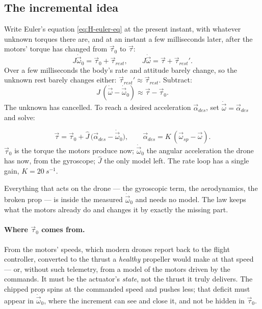 \subsection{The incremental idea}
Write Euler's equation \eqref{eq:H-euler-eq} at the present instant, with whatever unknown torques there are, and at an instant a few milliseconds later, after the motors' torque has changed from $\vec\tau_0$ to $\vec\tau$:
\begin{equation*}
  J\dot{\vec\omega}_0 = \vec\tau_0 + \vec\tau_{rest}, \qquad J\dot{\vec\omega} = \vec\tau + \vec\tau_{rest}' .
\end{equation*}
Over a few milliseconds the body's rate and attitude barely change, so the unknown rest barely changes either: $\vec\tau_{rest}' \approx \vec\tau_{rest}$. Subtract:
\begin{equation}\label{eq:indi-increment}
  J\,(\dot{\vec\omega} - \dot{\vec\omega}_0) \approx \vec\tau - \vec\tau_0 .
\end{equation}
The unknown has cancelled. To reach a desired acceleration $\vec\alpha_{des}$, set $\dot{\vec\omega} = \vec\alpha_{des}$ and solve:

\begin{result}
\begin{equation}\label{eq:indi-law}
  \vec\tau = \vec\tau_0 + \hat J\,\big(\vec\alpha_{des} - \dot{\vec\omega}_0\big), \qquad \vec\alpha_{des} = K\,(\vec\omega_{sp} - \vec\omega) .
\end{equation}
$\vec\tau_0$ is the torque the motors produce now; $\dot{\vec\omega}_0$ the angular acceleration the drone has now, from the gyroscope; $\hat J$ the only model left. The rate loop has a single gain, $K = \SI{20}{s^{-1}}$.
\end{result}

Everything that acts on the drone — the gyroscopic term, the aerodynamics, the broken prop — is inside the measured $\dot{\vec\omega}_0$ and needs no model. The law keeps what the motors already do and changes it by exactly the missing part.

\paragraph{Where $\vec\tau_0$ comes from.} From the motors' speeds, which modern drones report back to the flight controller, converted to the thrust a \emph{healthy} propeller would make at that speed — or, without such telemetry, from a model of the motors driven by the commands. It must be the actuator's \emph{state}, not the thrust it truly delivers. The chipped prop spins at the commanded speed and pushes less; that deficit must appear in $\dot{\vec\omega}_0$, where the increment can see and close it, and not be hidden in $\vec\tau_0$.

